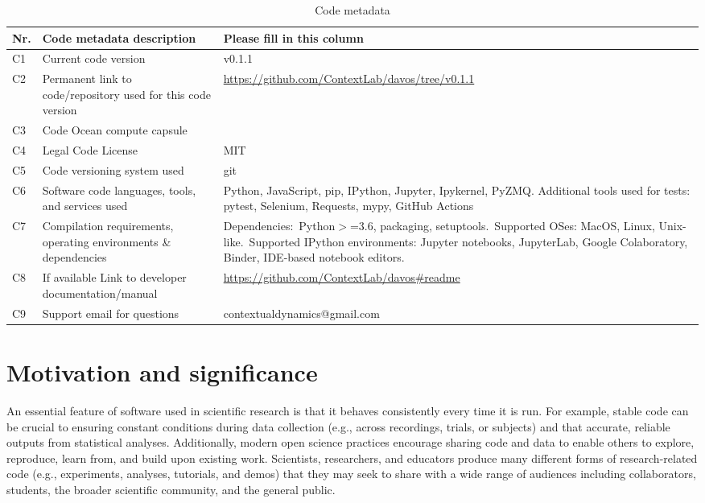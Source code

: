 \documentclass[preprint,12pt, a4paper]{elsarticle}
\begin{document}
\begin{table}[H]
\begin{tabular}{|l|p{6.5cm}|p{6.5cm}|}
\hline
\textbf{Nr.} & \textbf{Code metadata description} & \textbf{Please fill in this column} \\
\hline
C1 & Current code version &  v0.1.1 \\
\hline
C2 & Permanent link to code/repository used for this code version & \url{https://github.com/ContextLab/davos/tree/v0.1.1} \\
\hline
C3 & Code Ocean compute capsule & \\
\hline
C4 & Legal Code License & MIT \\
\hline
C5 & Code versioning system used & git \\
\hline
C6 & Software code languages, tools, and services used & Python, JavaScript, pip, IPython, Jupyter, Ipykernel, PyZMQ. Additional tools used for tests: pytest, Selenium, Requests, mypy, GitHub Actions \\
\hline
C7 & Compilation requirements, operating environments \& dependencies & Dependencies:~Python$>$=3.6, packaging, setuptools.~Supported OSes: MacOS, Linux, Unix-like.~Supported IPython environments: Jupyter notebooks, JupyterLab, Google Colaboratory, Binder, IDE-based notebook editors. \\
\hline
C8 & If available Link to developer documentation/manual & \url{https://github.com/ContextLab/davos\#readme} \\
\hline
C9 & Support email for questions & contextualdynamics@gmail.com \\
\hline
\end{tabular}
\caption{Code metadata}
\label{}
\end{table}

\linenumbers


\section{Motivation and significance}
An essential feature of software used in scientific research is that it behaves consistently every time it is run. For example, stable code can be crucial to ensuring constant conditions during data collection (e.g., across recordings, trials, or subjects) and that accurate, reliable outputs from statistical analyses. Additionally, modern open science practices encourage sharing code and data to enable others to explore, reproduce, learn from, and build upon existing work. Scientists, researchers, and educators produce many different forms of research-related code (e.g., experiments, analyses, tutorials, and demos) that they may seek to share with a wide range of audiences including collaborators, students, the broader scientific community, and the general public.
\end{document}
